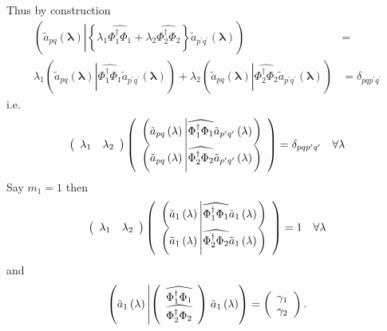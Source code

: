 \documentclass[aps,preprint]{revtex4}%
\begin{document}
Thus by construction
\begin{align}
\left(  \tilde{a}_{pq}\left(  \mathbf{\lambda}\right)  \left\vert \left\{
\lambda_{1}\widehat{\Phi_{1}^{\dagger}\Phi_{1}}+\lambda_{2}\widehat{\Phi
_{2}^{\dagger}\Phi_{2}}\right\}  \tilde{a}_{p^{\prime}q^{\prime}}\left(
\mathbf{\lambda}\right)  \right.  \right)   &  =\\
\lambda_{1}\left(  \tilde{a}_{pq}\left(  \mathbf{\lambda}\right)  \left\vert
\widehat{\Phi_{1}^{\dagger}\Phi_{1}}\tilde{a}_{p^{\prime}q^{\prime}}\left(
\mathbf{\lambda}\right)  \right.  \right)  +\lambda_{2}\left(  \tilde{a}%
_{pq}\left(  \mathbf{\lambda}\right)  \left\vert \widehat{\Phi_{2}^{\dagger
}\Phi_{2}}\tilde{a}_{p^{\prime}q^{\prime}}\left(  \mathbf{\lambda}\right)
\right.  \right)   &  =\delta_{pqp^{\prime}q^{\prime}}%
\end{align}
i.e.
\begin{equation}
\left(
\begin{array}
[c]{cc}%
\lambda_{1} & \lambda_{2}%
\end{array}
\right)  \left(
\begin{array}
[c]{c}%
\left(  \tilde{a}_{pq}\left(  \mathbf{\lambda}\right)  \left\vert
\widehat{\Phi_{1}^{\dagger}\Phi_{1}}\tilde{a}_{p^{\prime}q^{\prime}}\left(
\mathbf{\lambda}\right)  \right.  \right) \\
\left(  \tilde{a}_{pq}\left(  \mathbf{\lambda}\right)  \left\vert
\widehat{\Phi_{2}^{\dagger}\Phi_{2}}\tilde{a}_{p^{\prime}q^{\prime}}\left(
\mathbf{\lambda}\right)  \right.  \right)
\end{array}
\right)  =\delta_{pqp^{\prime}q^{\prime}}\quad\forall\mathbf{\lambda}%
\end{equation}
Say $m_{1}=1$ then
\begin{equation}
\left(
\begin{array}
[c]{cc}%
\lambda_{1} & \lambda_{2}%
\end{array}
\right)  \left(
\begin{array}
[c]{c}%
\left(  \tilde{a}_{1}\left(  \mathbf{\lambda}\right)  \left\vert \widehat
{\Phi_{1}^{\dagger}\Phi_{1}}\tilde{a}_{1}\left(  \mathbf{\lambda}\right)
\right.  \right) \\
\left(  \tilde{a}_{1}\left(  \mathbf{\lambda}\right)  \left\vert \widehat
{\Phi_{2}^{\dagger}\Phi_{2}}\tilde{a}_{1}\left(  \mathbf{\lambda}\right)
\right.  \right)
\end{array}
\right)  =1\quad\forall\mathbf{\lambda}%
\end{equation}
and
\begin{equation}
\left(  \tilde{a}_{1}\left(  \mathbf{\lambda}\right)  \left\vert \left(
\begin{array}
[c]{c}%
\widehat{\Phi_{1}^{\dagger}\Phi_{1}}\\
\widehat{\Phi_{2}^{\dagger}\Phi_{2}}%
\end{array}
\right)  \right.  \tilde{a}_{1}\left(  \mathbf{\lambda}\right)  \right)
=\left(
\begin{array}
[c]{c}%
\gamma_{1}\\
\gamma_{2}%
\end{array}
\right)  .
\end{equation}
\end{document}
